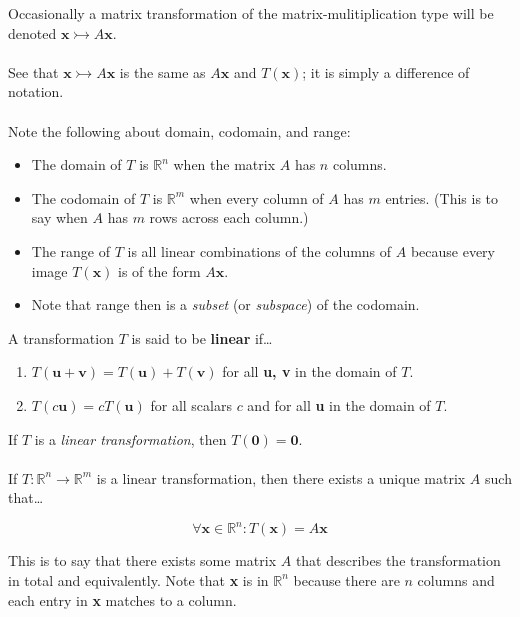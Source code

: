 \documentclass[12pt]{article}
\newcommand{\R}{\mathbb{R}}
\newcommand{\bt}[1]{\textbf{{#1}}}
\newcommand{\bm}[1]{\mathbf{{#1}}}
\begin{document}
Occasionally a matrix transformation of the matrix-mulitiplication type will be denoted $\bm{x} \rightarrowtail A\bm{x}$. \\ \\

See that $\bm{x} \rightarrowtail A\bm{x}$ is the same as $A\bm{x}$ and $T(\bm{x})$; it is simply a difference of notation. \\ \\

Note the following about domain, codomain, and range:

\begin{itemize}
    \item The domain of $T$ is $\R^n$ when the matrix $A$ has $n$ columns.
    \item The codomain of $T$ is $\R^m$ when every column of $A$ has $m$ entries. (This is to say when $A$ has $m$ rows across each column.)
    \item The range of $T$ is all linear combinations of the columns of $A$ because every image $T(\bm{x})$ is of the form $A\bm{x}$.
    \item Note that range then is a \emph{subset} (or \emph{subspace}) of the codomain.
\end{itemize}

A transformation $T$ is said to be \bt{linear} if\dots

\begin{enumerate}
    \item $T(\bm{u + v}) = T(\bm{u}) + T(\bm{v})$ for all \bt{u, v} in the domain of $T$.
    \item $T(c\bm{u}) = cT(\bm{u})$ for all scalars $c$  and for all \bt{u} in the domain of $T$.
\end{enumerate}

If $T$ is a \emph{linear transformation}, then $T(\bm{0}) = \bm{0}$. \\ \\

If $T: \R^n \rightarrow \R^m$ is a linear transformation, then there exists a unique matrix $A$ such that\dots

$$\forall \bm{x} \in \R^n: T(\bm{x}) = A\bm{x}$$

This is to say that there exists some matrix $A$ that describes the transformation in total and equivalently.
Note that \bt{x} is in $\R^n$ because there are $n$ columns and each entry in \bt{x} matches to a column. \\ \\
\end{document}
